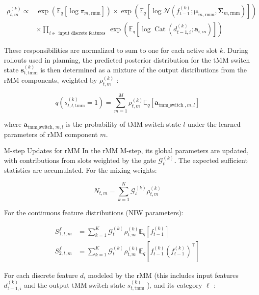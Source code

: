 \documentclass[10pt]{article}
\begin{document}
\begin{align*}
\rho_{t, m}^{(k)} \propto & \exp \left(\mathbb{E}_{q}\left[\log \pi_{m, \mathrm{rmm}}\right]\right) \times \exp \left(\mathbb{E}_{q}\left[\log \mathcal{N}\left(f_{t-1}^{(k)} ; \boldsymbol{\mu}_{m, \mathrm{rmm}}, \boldsymbol{\Sigma}_{m, \mathrm{rmm}}\right)\right]\right) \\
& \times \prod_{i \in \text { input discrete features }} \exp \left(\mathbb{E}_{q}\left[\log \operatorname{Cat}\left(d_{t-1, i}^{(k)} ; \mathbf{a}_{i, m}\right)\right]\right) \tag{52}
\end{align*}


These responsibilities are normalized to sum to one for each active slot $k$. During rollouts used in planning, the predicted posterior distribution for the tMM switch state $\mathbf{s}_{t, \mathrm{tmm}}^{(k)}$ is then determined as a mixture of the output distributions from the rMM components, weighted by $\rho_{t, m}^{(k)}$ :

$$
q\left(s_{t, l, \mathrm{tmm}}^{(k)}=1\right)=\sum_{m=1}^{M} \rho_{t, m}^{(k)} \mathbb{E}_{q}\left[\mathbf{a}_{\mathrm{tmm} \_ \text {switch }, m, l}\right]
$$

where $\mathbf{a}_{\text {tmm_switch, } m, l}$ is the probability of tMM switch state $l$ under the learned parameters of rMM component $m$.

M-step Updates for rMM In the rMM M-step, its global parameters are updated, with contributions from slots weighted by the gate $\mathcal{G}_{t}^{(k)}$. The expected sufficient statistics are accumulated. For the mixing weights:


\begin{equation*}
N_{t, m}=\sum_{k=1}^{K} \mathcal{G}_{t}^{(k)} \rho_{t, m}^{(k)} \tag{53}
\end{equation*}


For the continuous feature distributions (NIW parameters):


\begin{align*}
S_{1, t, m}^{f} & =\sum_{k=1}^{K} \mathcal{G}_{t}^{(k)} \rho_{t, m}^{(k)} \mathbb{E}_{q}\left[f_{t-1}^{(k)}\right]  \tag{54}\\
S_{2, t, m}^{f} & =\sum_{k=1}^{K} \mathcal{G}_{t}^{(k)} \rho_{t, m}^{(k)} \mathbb{E}_{q}\left[f_{t-1}^{(k)}\left(f_{t-1}^{(k)}\right)^{\top}\right]
\end{align*}


For each discrete feature $d_{i}$ modeled by the rMM (this includes input features $d_{t-1, i}^{(k)}$ and the output tMM switch state $s_{t, \mathrm{tmm}}^{(k)}$ ), and its category $\ell$ :
\end{document}

